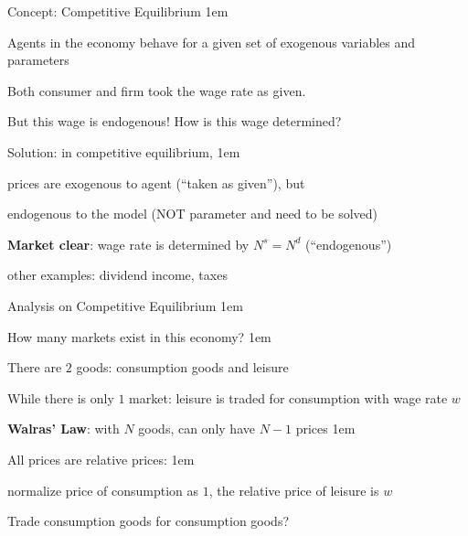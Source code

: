 \documentclass[11pt,aspectratio=43]{beamer}
\let\olditemize=\itemize
\let\endolditemize=\enditemize
\renewenvironment{itemize}{\olditemize \itemsep1em}{\endolditemize}
\theoremstyle{definition}
\begin{document}
\begin{frame}{Concept: Competitive Equilibrium}
\label{slide:Concept__Competitive_Equilibrium}
\begin{itemize}
    \item Agents in the economy behave for a \alert{given} set of \alert{exogenous variables} and \alert{parameters}
    \item Both consumer and firm \alert{took the wage rate as given}.
    \item But this wage is \alert{endogenous}! How is this wage determined?
    \item Solution: in competitive equilibrium,
    \begin{itemize}
        \item prices are \alert{exogenous to agent} (``taken as given''), but
        \item \alert{endogenous to the model} (NOT parameter and need to be solved)
    \end{itemize}
    \item \textbf{Market clear}: wage rate is determined by $ N^{s} = N^{d} $ (``endogenous'')
    \item other examples: dividend income, taxes
\end{itemize}

\end{frame}

\begin{frame}{Analysis on Competitive Equilibrium}
\label{slide:Analysis_on_Competitive_Equilibrium}
\begin{itemize}
    \item How many markets exist in this economy?
    \begin{itemize}
        \item There are $ 2 $ goods: consumption goods and leisure
        \item While there is only $ 1 $ market: leisure is traded for consumption with wage rate $ w $
    \end{itemize}
    \item \textbf{Walras' Law}: with $ N $ goods, can only have $ N-1 $ prices
    \begin{itemize}
        \item All prices are \alert{relative prices}:
        \begin{itemize}
            \item \alert{normalize} price of consumption as $ 1 $, the relative price of leisure is $ w $
        \end{itemize}
        \item Trade consumption goods for consumption goods?
    \end{itemize}
\end{itemize}
\end{frame}
\end{document}
